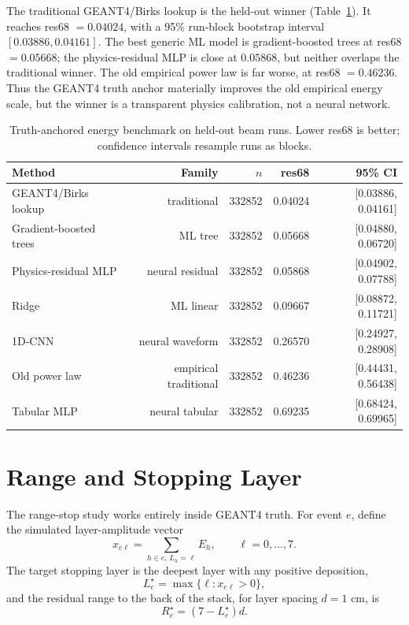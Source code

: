 The traditional GEANT4/Birks lookup is the held-out winner
(Table~\ref{tab:g4-energy-benchmark}). It reaches res68 \(=0.04024\), with a
95\% run-block bootstrap interval \([0.03886,0.04161]\). The best generic ML
model is gradient-boosted trees at res68 \(=0.05668\); the physics-residual MLP
is close at \(0.05868\), but neither overlaps the traditional winner. The old
empirical power law is far worse, at res68 \(=0.46236\). Thus the GEANT4 truth
anchor materially improves the old empirical energy scale, but the winner is a
transparent physics calibration, not a neural network.

\begin{table}[H]
\centering
\caption{Truth-anchored energy benchmark on held-out beam runs. Lower res68 is
better; confidence intervals resample runs as blocks.}
\label{tab:g4-energy-benchmark}
\begin{tabular}{lrrrr}
\toprule
Method & Family & \(n\) & res68 & 95\% CI \\
\midrule
GEANT4/Birks lookup & traditional & 332852 & 0.04024 & [0.03886, 0.04161] \\
Gradient-boosted trees & ML tree & 332852 & 0.05668 & [0.04880, 0.06720] \\
Physics-residual MLP & neural residual & 332852 & 0.05868 & [0.04902, 0.07788] \\
Ridge & ML linear & 332852 & 0.09667 & [0.08872, 0.11721] \\
1D-CNN & neural waveform & 332852 & 0.26570 & [0.24927, 0.28908] \\
Old power law & empirical traditional & 332852 & 0.46236 & [0.44431, 0.56438] \\
Tabular MLP & neural tabular & 332852 & 0.69235 & [0.68424, 0.69965] \\
\bottomrule
\end{tabular}
\end{table}

\section{Range and Stopping Layer}

The range-stop study works entirely inside GEANT4 truth. For event \(e\), define
the simulated layer-amplitude vector
\[
x_{e\ell}=\sum_{h\in e,\,L_h=\ell} E_h,
\qquad \ell=0,\ldots,7.
\]
The target stopping layer is the deepest layer with any positive deposition,
\[
L_e^\star = \max\{\ell:x_{e\ell}>0\},
\]
and the residual range to the back of the stack, for layer spacing \(d=1\) cm, is
\[
R_e^\star=(7-L_e^\star)d.
\]

